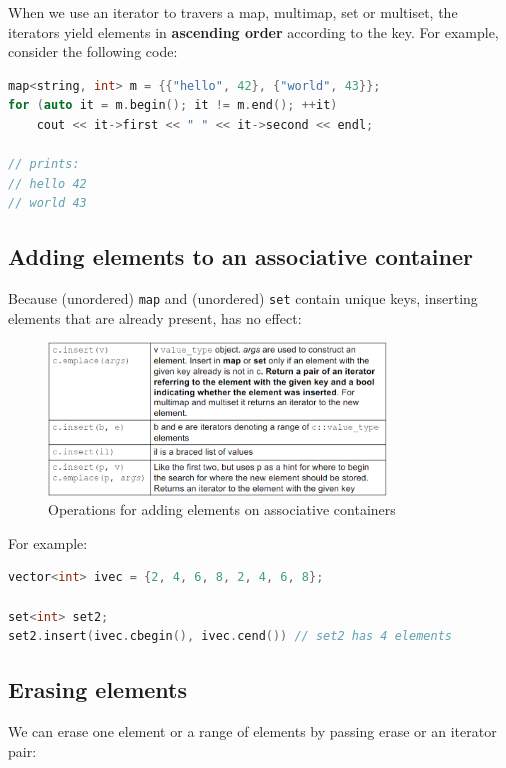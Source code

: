 When we use an iterator to travers a map, multimap, set or multiset, the iterators yield 
elements in \textbf{ascending order} according to the key. For example, consider the following
code:\\

\begin{lstlisting}[language=C++]
map<string, int> m = {{"hello", 42}, {"world", 43}};
for (auto it = m.begin(); it != m.end(); ++it)
    cout << it->first << " " << it->second << endl;

// prints:
// hello 42
// world 43
\end{lstlisting}

\subsection{Adding elements to an associative container}

Because (unordered) \texttt{map} and (unordered) \texttt{set} contain unique keys, inserting
elements that are already present, has no effect:

\begin{figure}[H]
    \centering
    \includegraphics[width=0.8\textwidth]{figures/associative_add_ops.png}
    \caption{Operations for adding elements on associative containers}
    \label{fig:associative_add_ops}
\end{figure}

For example:

\begin{lstlisting}[language=C++]
vector<int> ivec = {2, 4, 6, 8, 2, 4, 6, 8};

set<int> set2;
set2.insert(ivec.cbegin(), ivec.cend()) // set2 has 4 elements
\end{lstlisting}

\subsection{Erasing elements}

We can erase one element or a range of elements by passing erase or an iterator pair:

